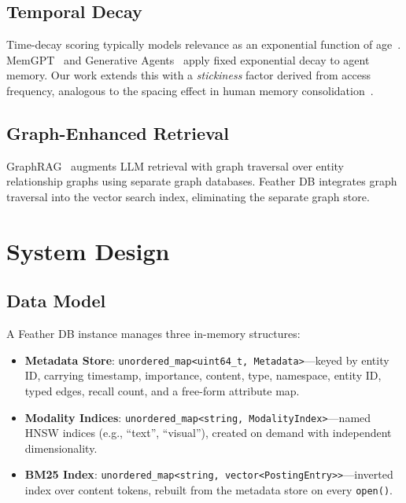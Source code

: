 \documentclass[11pt,twocolumn]{article}
\begin{document}
\subsection{Temporal Decay}

Time-decay scoring typically models relevance as an exponential function of
age~\citep{li2003}. MemGPT~\citep{packer2023} and Generative
Agents~\citep{park2023} apply fixed exponential decay to agent memory. Our
work extends this with a \emph{stickiness} factor derived from access frequency,
analogous to the spacing effect in human memory consolidation~\citep{ebbinghaus1885}.

\subsection{Graph-Enhanced Retrieval}

GraphRAG~\citep{edge2024} augments LLM retrieval with graph traversal over entity
relationship graphs using separate graph databases. Feather DB integrates graph
traversal into the vector search index, eliminating the separate graph store.

\section{System Design}
\label{sec:design}

\subsection{Data Model}

A Feather DB instance manages three in-memory structures:

\begin{itemize}[leftmargin=*,itemsep=2pt]
  \item \textbf{Metadata Store}: \texttt{unordered\_map<uint64\_t, Metadata>}---keyed
        by entity ID, carrying timestamp, importance, content, type, namespace,
        entity ID, typed edges, recall count, and a free-form attribute map.
  \item \textbf{Modality Indices}: \texttt{unordered\_map<string, ModalityIndex>}---named
        HNSW indices (e.g., ``text'', ``visual''), created on demand with independent
        dimensionality.
  \item \textbf{BM25 Index}: \texttt{unordered\_map<string, vector<PostingEntry>>}---inverted
        index over content tokens, rebuilt from the metadata store on every \texttt{open()}.
\end{itemize}
\end{document}
